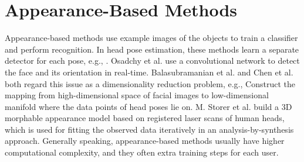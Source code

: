 \section{Appearance-Based Methods}
Appearance-based methods use example images of the objects to train a classifier and perform recognition. In head pose estimation, these methods learn a separate detector for each pose, e.g., \cite{Morency:03:PEU3VBE}. Osadchy et al. \cite{Osadchy:07:SFDPEEBM} use a convolutional network to detect the face and its orientation in real-time. Balasubramanian et al. \cite{Balasubramanian:07:BMEAFFPIHPE} and Chen et al. \cite{Chen:03:HPEUFML} both regard this issue as a dimensionality reduction problem, e.g., Construct the mapping from high-dimensional space of facial images to low-dimensional manifold where the data points of head poses lie on. M. Storer et al.\cite{Storer:09:3DMAM} build a 3D morphable appearance model based on registered laser scans of human heads, which is used for fitting the observed data iteratively in an analysis-by-synthesis approach. Generally speaking, appearance-based methods usually have higher computational complexity, and they often extra training steps for each user.

